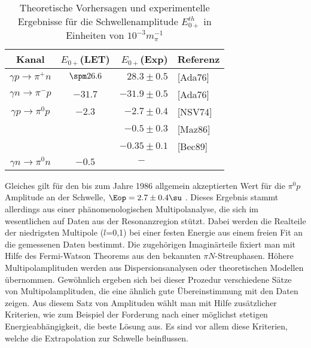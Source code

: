 \begin{table}
\caption{Theoretische Vorhersagen und experimentelle Ergebnisse
f\"ur die Schwellenamplitude $ E_{0+}^{th}$ in Einheiten von
$10^{-3}m_\pi^{-1}$ }
\begin{center}
\begin{tabular}{|c||c|rl|} \hline
Kanal                  & $E_{0+}$(LET) & $E_{0+}$(Exp)  & Referenz \\ \hline
                                                                      \hline 
$\gamma p \to \pi^+ n$ &$\spm 26.6$    &  $28.3\pm 0.5$ & [Ada76] \\ \hline
$\gamma n \to \pi^- p$ &    $-31.7$    & $-31.9\pm 0.5$ & [Ada76] \\ \hline
$\gamma p \to \pi^0 p$ &    $-2.3$     &  $-2.7\pm 0.4$ & [NSV74] \\
                       &               &  $-0.5\pm 0.3$ & [Maz86] \\
		       &               & $-0.35\pm 0.1$ & [Bec89] \\ \hline  
$\gamma n \to \pi^0 n$ &    $-0.5$     & $-\hspace{1cm}$  &        \\ \hline
\end{tabular}
\end{center}
\end{table}

Gleiches gilt f\"ur den bis zum Jahre 1986 allgemein akzeptierten 
Wert f\"ur die $\pi^0 p$ Amplitude an der Schwelle, $\Eop=
2.7\pm 0.4 \su$ \cite{NSV74}. Dieses Ergebnis stammt allerdings aus
einer ph\"anomenologischen Multipolanalyse, die sich im wesentlichen
auf Daten aus der Resonanzregion st\"utzt. Dabei werden die Realteile
der niedrigsten Multipole ($l$=0,1) bei einer festen  Energie aus
einem freien Fit an die gemessenen Daten bestimmt. Die zugeh\"origen
Imagin\"arteile fixiert man mit Hilfe des Fermi-Watson Theorems aus
den bekannten $\pi N$-Streuphasen. H\"ohere Multipolamplituden werden
aus Dispersionsanalysen oder theoretischen Modellen \"ubernommen. 
Gew\"ohnlich ergeben sich bei
dieser Prozedur verschiedene S\"atze von Multipolamplituden, die eine
\"ahnlich gute \"Ubereinstimmung mit den Daten zeigen. Aus diesem Satz
von Amplituden w\"ahlt man mit Hilfe zus\"atzlicher Kriterien, wie
zum Beispiel der Forderung nach einer m\"oglichst stetigen 
Energieabh\"angigkeit, die beste L\"osung aus. Es sind vor allem diese
Kriterien, welche die Extrapolation zur Schwelle beinflussen.

